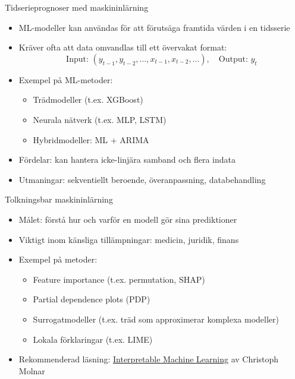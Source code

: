 \documentclass[10pt,english]{beamer}
\begin{document}
\begin{frame}{Tidserieprognoser med maskininlärning}
  \begin{itemize}
    \item ML-modeller kan användas för att förutsäga framtida värden i en tidsserie
    \item Kräver ofta att data omvandlas till ett övervakat format:
    \[
    \text{Input: } (y_{t-1}, y_{t-2}, \dots, x_{t-1}, x_{t-2}, \dots), \quad \text{Output: } y_t
    \]
    \item Exempel på ML-metoder:
    \begin{itemize}
      \item Trädmodeller (t.ex. XGBoost)
      \item Neurala nätverk (t.ex. MLP, LSTM)
      \item Hybridmodeller: ML + ARIMA
    \end{itemize}
    \item Fördelar: kan hantera icke-linjära samband och flera indata
    \item Utmaningar: sekventiellt beroende, överanpassning, databehandling
  \end{itemize}
\end{frame}

\begin{frame}{Tolkningsbar maskininlärning}
  \begin{itemize}
    \item Målet: förstå hur och varför en modell gör sina prediktioner
    \item Viktigt inom känsliga tillämpningar: medicin, juridik, finans
    \item Exempel på metoder:
    \begin{itemize}
      \item Feature importance (t.ex. permutation, SHAP)
      \item Partial dependence plots (PDP)
      \item Surrogatmodeller (t.ex. träd som approximerar komplexa modeller)
      \item Lokala förklaringar (t.ex. LIME)
    \end{itemize}
    \item Rekommenderad läsning: \href{https://christophm.github.io/interpretable-ml-book/}{Interpretable Machine Learning}  av Christoph Molnar
  \end{itemize}
\end{frame}
\end{document}
